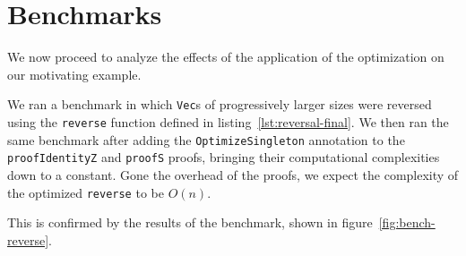 \section{Benchmarks}
\label{sec:benchmarks}

We now proceed to analyze the effects of the application of the optimization on our motivating example.

We ran a benchmark in which \texttt{Vec}s of progressively larger sizes were reversed using the \texttt{reverse} function defined in listing~\ref{lst:reversal-final}.
We then ran the same benchmark after adding the \texttt{OptimizeSingleton} annotation to the \texttt{proofIdentityZ} and \texttt{proofS} proofs, bringing their computational complexities down to a constant.
Gone the overhead of the proofs, we expect the complexity of the optimized \texttt{reverse} to be $O(n)$.

This is confirmed by the results of the benchmark, shown in figure~\ref{fig:bench-reverse}.

